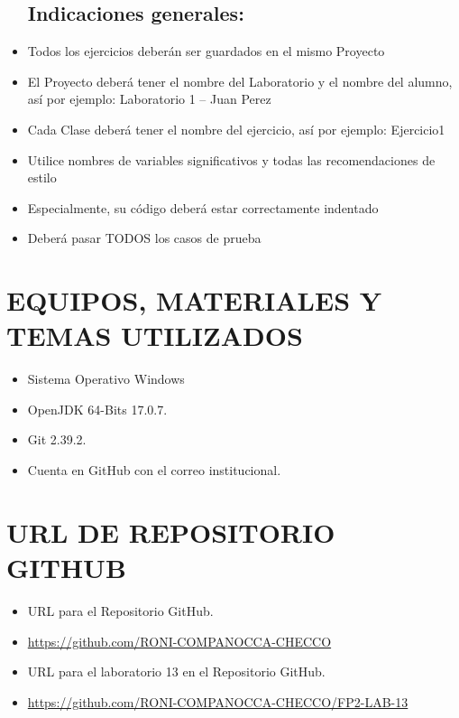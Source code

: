 \documentclass{article}
\begin{document}
\begin{itemize}
    \subsection{Indicaciones generales:}
        \item Todos los ejercicios deberán ser guardados en el mismo Proyecto
        \item El Proyecto deberá tener el nombre del Laboratorio y el nombre del alumno, así por ejemplo: Laboratorio 1 – Juan Perez
        \item Cada Clase deberá tener el nombre del ejercicio, así por ejemplo: Ejercicio1
        \item Utilice nombres de variables significativos y todas las recomendaciones de estilo
        \item Especialmente, su código deberá estar correctamente indentado
        \item Deberá pasar TODOS los casos de prueba
	\end{itemize}

    \section{EQUIPOS, MATERIALES Y TEMAS UTILIZADOS}
	\begin{itemize}
		\item Sistema Operativo Windows
		\item OpenJDK 64-Bits 17.0.7.
		\item Git 2.39.2.	
  	\item Cuenta en GitHub con el correo institucional.
	\end{itemize}

    \section{URL DE REPOSITORIO GITHUB}
	\begin{itemize}
		\item URL para el Repositorio GitHub.
		\item \url{https://github.com/RONI-COMPANOCCA-CHECCO}
		\item URL para el laboratorio 13 en el Repositorio GitHub.	
        \item \url{https://github.com/RONI-COMPANOCCA-CHECCO/FP2-LAB-13}
	\end{itemize}
    
\end{document}
